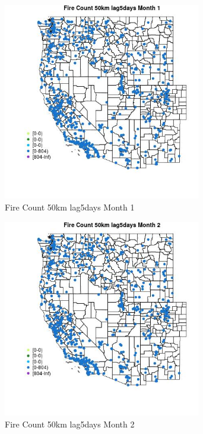 \begin{figure} 
\centering  
\includegraphics[width=0.77\textwidth]{Code_Outputs/Report_ML_input_PM25_Step4_part_f_de_duplicated_aves_prioritize_24hr_obswNAs_MapObsMo1Fire_Count_50km_lag5days.jpg} 
\caption{\label{fig:Report_ML_input_PM25_Step4_part_f_de_duplicated_aves_prioritize_24hr_obswNAsMapObsMo1Fire_Count_50km_lag5days}Fire Count 50km lag5days Month 1} 
\end{figure} 
 

\begin{figure} 
\centering  
\includegraphics[width=0.77\textwidth]{Code_Outputs/Report_ML_input_PM25_Step4_part_f_de_duplicated_aves_prioritize_24hr_obswNAs_MapObsMo2Fire_Count_50km_lag5days.jpg} 
\caption{\label{fig:Report_ML_input_PM25_Step4_part_f_de_duplicated_aves_prioritize_24hr_obswNAsMapObsMo2Fire_Count_50km_lag5days}Fire Count 50km lag5days Month 2} 
\end{figure} 
 

